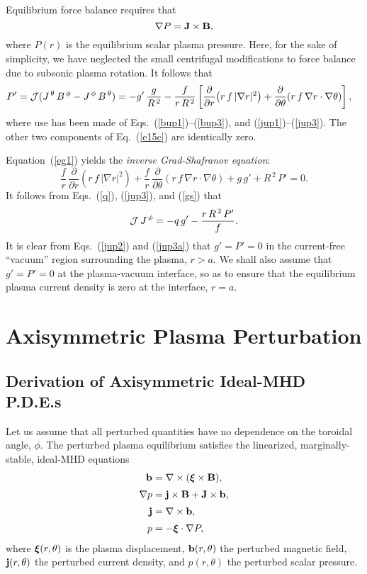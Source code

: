 \documentclass[12pt,prb,aps]{revtex4-1}
\newcommand {\bxi}{\mbox{\boldmath$\xi$}}
\begin{document}
Equilibrium force balance requires that
\begin{equation}\label{e15c}
 \nabla P={\bf J}\times {\bf B},
\end{equation}
where $P(r)$ is the equilibrium scalar plasma pressure. Here, for the sake of simplicity, we have neglected the small centrifugal modifications to force balance due to subsonic plasma
rotation.\cite{flow,flow1}
It follows that 
\begin{align}\label{eg1}
P'&= {\cal J}(J^{\,\theta}\,B^{\,\phi}-J^{\,\phi}\,B^{\,\theta})= -g'\,\frac{g}{R^{\,2}} - \frac{f}{r\,R^{\,2}}\left[\frac{\partial}{\partial r}\!\left(r\,f\,|\nabla r|^2\right)+ \frac{\partial}{\partial\theta}\!\left(r\,f\,\nabla r\cdot\nabla\theta\right)\right],
\end{align}
where use has been made of Eqs.~(\ref{bup1})--(\ref{bup3}), and  (\ref{jup1})--(\ref{jup3}). The
other two components of Eq.~(\ref{e15c}) are identically zero. 

Equation~(\ref{eg1}) yields the {\em inverse Grad-Shafranov equation}:\cite{connor}
\begin{equation}\label{gs}
\frac{f}{r}\,\frac{\partial}{\partial r}\!\left(r\,f\,|\nabla r|^2\right) +\frac{f}{r}\,\frac{\partial}{\partial\theta}\!\left(r\,f\,\nabla r\cdot\nabla\theta\right)+g\,g' + R^{\,2}\,P'=0.
\end{equation}
It follows from Eqs.~(\ref{q}), (\ref{jup3}), and (\ref{gs}) that
\begin{equation}\label{jup3a}
{\cal J}\,J^{\,\phi} = -q\,g' - \frac{r\,R^{\,2}\,P'}{f}.
\end{equation}
It is clear from Eqs.~(\ref{jup2}) and (\ref{jup3a}) that $g'=P'=0$ in the  current-free ``vacuum'' region surrounding the plasma, $r>a$. 
We shall also assume that $g'=P'=0$ at the plasma-vacuum interface, so as to ensure that the equilibrium plasma
current density is zero at the interface, $r=a$. 

\section{Axisymmetric Plasma Perturbation}\label{opde}

\subsection{Derivation of Axisymmetric Ideal-MHD P.D.E.s}
Let us assume that all perturbed quantities have no dependence on  the toroidal angle, $\phi$. 
The perturbed plasma equilibrium satisfies the  linearized, marginally-stable, ideal-MHD equations\,\cite{connor,am1,gs1}
\begin{align}
{\bf b} &= \nabla\times (\bxi\times {\bf B}),\label{e21}\\[0.5ex]
\nabla p &={\bf j}\times {\bf B}  +{\bf J}\times {\bf b},\label{e22}\\[0.5ex]
{\bf j} &= \nabla\times {\bf b},\label{e23}\\[0.5ex]
p&= -\bxi\cdot\nabla P,\label{e24}
\end{align}
where $\bxi(r,\theta)$ is the plasma displacement, ${\bf b}(r,\theta)$ the perturbed magnetic field,
${\bf j}(r,\theta)$ the perturbed current density, and $p(r,\theta)$ the perturbed scalar pressure. 
\end{document}
